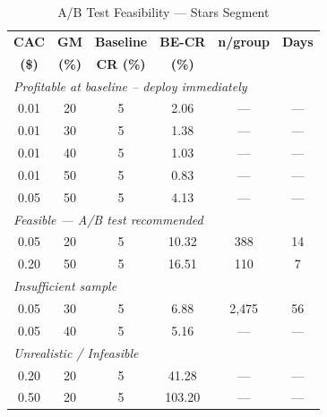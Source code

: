 \documentclass[conference]{IEEEtran}
\begin{document}
\begin{table}[H]
\centering
\caption{A/B Test Feasibility --- Stars Segment}
\label{tab:ab_feasibility}

\renewcommand{\arraystretch}{1.3}
\setlength{\tabcolsep}{4pt}
\footnotesize

\begin{tabular}{| c c c c c c |}
\toprule

\textbf{CAC} & \textbf{GM} & \textbf{Baseline} & \textbf{BE-CR}
& \textbf{n/group} & \textbf{Days} \\

\textbf{(\$)} & \textbf{(\%)} & \textbf{CR (\%)}
& \textbf{(\%)} & & \\

\midrule

\multicolumn{6}{|l|}{\textit{Profitable at baseline -- 
deploy immediately}} \\

0.01 & 20 & 5 & 2.06 & --- & --- \\
0.01 & 30 & 5 & 1.38 & --- & --- \\
0.01 & 40 & 5 & 1.03 & --- & --- \\
0.01 & 50 & 5 & 0.83 & --- & --- \\
0.05 & 50 & 5 & 4.13 & --- & --- \\

\midrule

\multicolumn{6}{|l|}{\textit{Feasible --- A/B test 
recommended}} \\

0.05 & 20 & 5 & 10.32 & 388 & 14 \\
0.20 & 50 & 5 & 16.51 & 110 & 7 \\

\midrule

\multicolumn{6}{|l|}{\textit{Insufficient sample}} \\

0.05 & 30 & 5 & 6.88 & 2{,}475 & 56 \\
0.05 & 40 & 5 & 5.16 & --- & --- \\

\midrule

\multicolumn{6}{|l|}{\textit{Unrealistic / Infeasible}} \\

0.20 & 20 & 5 & 41.28 & --- & --- \\
0.50 & 20 & 5 & 103.20 & --- & --- \\

\bottomrule
\end{tabular}

\end{table}
\end{document}
